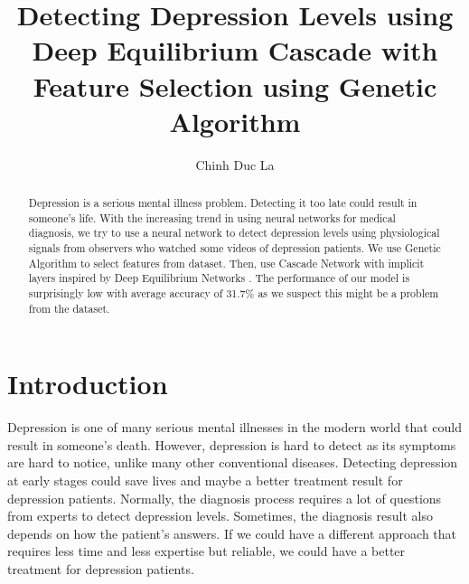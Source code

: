\documentclass[runningheads]{llncs}
\begin{document}
%
\title{Detecting Depression Levels using Deep Equilibrium Cascade with Feature Selection using Genetic Algorithm}
%
%
\author{Chinh Duc La}
%
%
%
\maketitle              %
%
\begin{abstract}
Depression is a serious mental illness problem. Detecting it too late could result in someone’s life. With the increasing trend in using neural networks for medical diagnosis, we try to use a neural network to detect depression levels using physiological signals from observers who watched some videos of depression patients. We use Genetic Algorithm to select features from dataset. Then, use Cascade Network\cite{casper_paper} with implicit layers inspired by Deep Equilibrium Networks \cite{deq_paper}. The performance of our model is surprisingly low with average accuracy of 31.7\% as we suspect this might be a problem from the dataset.

\end{abstract}
%
%
%
\section{Introduction}

Depression is one of many serious mental illnesses in the modern world that could result in someone’s death. However, depression is hard to detect as its symptoms are hard to notice, unlike many other conventional diseases. Detecting depression at early stages could save lives and maybe a better treatment result for depression patients. Normally, the diagnosis process requires a lot of questions from experts to detect depression levels. Sometimes, the diagnosis result also depends on how the patient’s answers. If we could have a different approach that requires less time and less expertise but reliable, we could have a better treatment for depression patients.
\end{document}
